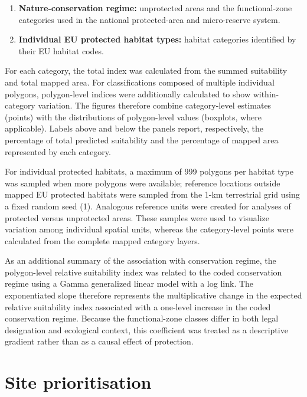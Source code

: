 \documentclass[
  openany]{book}
\begin{document}
\begin{enumerate}
\def\labelenumi{\arabic{enumi}.}
\setcounter{enumi}{3}
\item
  \textbf{Nature-conservation regime:} unprotected areas and the functional-zone categories used in the national protected-area and micro-reserve system.
\item
  \textbf{Individual EU protected habitat types:} habitat categories identified by their EU habitat codes.
\end{enumerate}

For each category, the total index was calculated from the summed suitability and total mapped area. For classifications composed of multiple individual polygons, polygon-level indices were additionally calculated to show within-category variation. The figures therefore combine category-level estimates (points) with the distributions of polygon-level values (boxplots, where applicable). Labels above and below the panels report, respectively, the percentage of total predicted suitability and the percentage of mapped area represented by each category.

For individual protected habitats, a maximum of 999 polygons per habitat type was sampled when more polygons were available; reference locations outside mapped EU protected habitats were sampled from the 1-km terrestrial grid using a fixed random seed (1). Analogous reference units were created for analyses of protected versus unprotected areas. These samples were used to visualize variation among individual spatial units, whereas the category-level points were calculated from the complete mapped category layers.

As an additional summary of the association with conservation regime, the polygon-level relative suitability index was related to the coded conservation regime using a Gamma generalized linear model with a log link. The exponentiated slope therefore represents the multiplicative change in the expected relative suitability index associated with a one-level increase in the coded conservation regime. Because the functional-zone classes differ in both legal designation and ecological context, this coefficient was treated as a descriptive gradient rather than as a causal effect of protection.

\section{Site prioritisation}\label{prioritisation}
\end{document}
